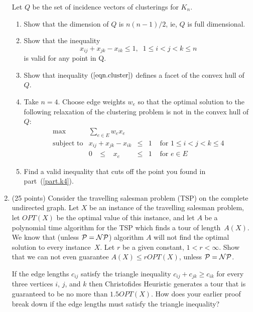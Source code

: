 \begin{enumerate}
Let $Q$ be the set of incidence vectors of clusterings
for $K_n$.
\begin{enumerate}
 \item Show that the dimension of $Q$ is $n(n-1)/2$, ie, $Q$
is full dimensional.
 \item Show that the inequality
\begin{equation}  \label{eqn.cluster}
  x_{ij} + x_{jk} - x_{ik}  \leq  1, \;\;  1 \leq i <j<k \leq n
\end{equation}
is valid for any point in Q.
 \item Show that inequality $(\ref{eqn.cluster})$ defines
a facet of the convex hull of~$Q$.
 \item \label{part.k4}
Take $n=4$.
Choose edge weights $w_e$ so that
the optimal solution to the following relaxation of the
clustering problem is not in the convex hull of~$Q$:
\begin{displaymath}
 \begin{array}{lccll}
  \max & \sum_{e \in E} w_e x_e \\
  \mbox{subject to} & x_{ij}+x_{jk}-x_{ik} & \leq & 1 & \mbox{ for }
      1 \leq i < j < k \leq 4 \\
  & 0 \;\;\; \leq \;\;\;  x_e & \leq & 1 & \mbox{ for } e \in E
 \end{array}
\end{displaymath}
 \item
Find a valid inequality that cuts off the point you found in
part~(\ref{part.k4}).
\end{enumerate}

   \item (25 points)
         Consider the travelling salesman problem (TSP) on the complete
         undirected graph. Let $X$ be an instance of the travelling salesman
         problem, let $OPT(X)$ be the optimal value of this instance, and
         let $A$ be a polynomial time algorithm for the TSP which finds a
         tour of length~$A(X)$. We know that (unless $\cal{P}=\cal{NP}$)
         algorithm $A$ will not find the optimal solution to every instance~$X$.
         Let $r$ be a given constant, $1 < r < \infty$.
         Show that we can not even guarantee $A(X) \leq rOPT(X)$,
         unless $\cal{P}=\cal{NP}$.

         If the edge lengths $c_{ij}$ satisfy the triangle inequality
         $c_{ij}+c_{jk}\geq c_{ik}$ for every three vertices $i$, $j$,
         and $k$ then Christofides Heuristic generates a tour that is
         guaranteed to be no more than $1.5 OPT(X)$.
         How does your earlier proof break down if the edge lengths
         must satisfy the triangle inequality?


\end{enumerate}
